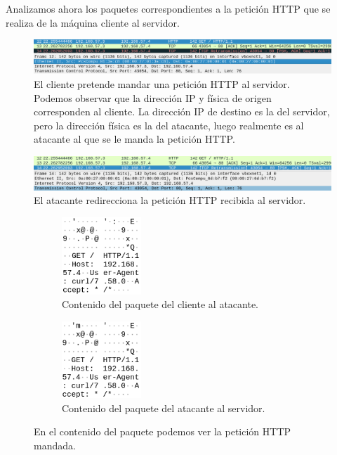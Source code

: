 \documentclass[11pt]{article}
\begin{document}
Analizamos ahora los paquetes correspondientes a la petición HTTP que se realiza de la máquina cliente al servidor. 

\begin{figure}[H]
	\centering
	\includegraphics[width=160mm]{images/atack1/request-client-atacker}
	\caption{El cliente pretende mandar una petición HTTP al servidor. Podemos observar que la dirección IP y física de origen corresponden al cliente. La dirección IP de destino es la del servidor, pero la dirección física es la del atacante, luego realmente es al atacante al que se le manda la petición HTTP.}
	\label{fig:request-client-atacker}
\end{figure}

\begin{figure}[H]
	\centering
	\includegraphics[width=160mm]{images/atack1/request-atacker-server}
	\caption{El atacante redirecciona la petición HTTP recibida al servidor. }
	\label{fig:request-atacker-server}
\end{figure}

\begin{figure}[H]
	\centering
	\begin{subfigure}{0.45\textwidth}
		\centering
		\includegraphics[width=30mm]{images/atack1/client-atacker}
		\captionsetup{width=0.5\linewidth}
		\caption{Contenido del paquete del cliente al atacante.}
	\end{subfigure}
	\hspace{-20mm}
	\begin{subfigure}{0.45\textwidth}
		\centering
		\includegraphics[width=30mm]{images/atack1/atacker-server}
		\captionsetup{width=0.5\linewidth}
		\caption{Contenido del paquete del atacante al servidor.}
	\end{subfigure}
	\caption{En el contenido del paquete podemos ver la petición HTTP mandada.}
\end{figure}
\end{document}
